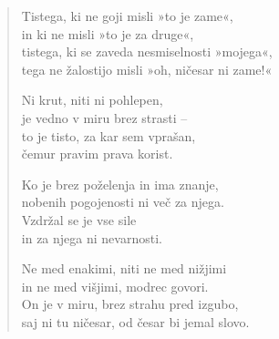 \begin{verse}
Tistega, ki ne goji misli »to je zame«,\\
in ki ne misli »to je za druge«,\\
tistega, ki se zaveda nesmiselnosti »mojega«,\\
tega ne žalostijo misli »oh, ničesar ni zame!«

Ni krut, niti ni pohlepen,\\
je vedno v miru brez strasti --\\
to je tisto, za kar sem vprašan,\\
čemur pravim prava korist.

Ko je brez poželenja in ima znanje,\\
nobenih pogojenosti ni več za njega.\\
Vzdržal se je vse sile\\
in za njega ni nevarnosti.

Ne med enakimi, niti ne med nižjimi\\
in ne med višjimi, modrec govori.\\
On je v miru, brez strahu pred izgubo,\\
saj ni tu ničesar, od česar bi jemal slovo.

\end{verse}


\clearpage
\begin{verse}


\end{verse}


\clearpage
\begin{verse}


\end{verse}

